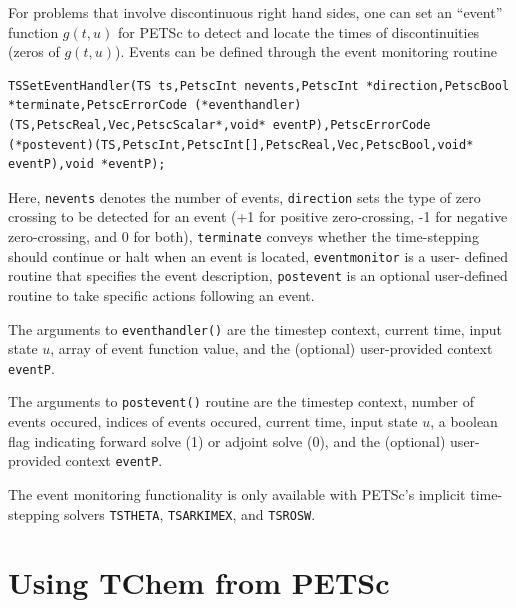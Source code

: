 For problems that involve discontinuous right hand sides, one can set an ``event'' function
$ g(t,u) $ for PETSc to detect and locate the times of discontinuities (zeros of $g(t,u)$). Events can be defined through the
event monitoring routine
\begin{lstlisting}
TSSetEventHandler(TS ts,PetscInt nevents,PetscInt *direction,PetscBool *terminate,PetscErrorCode (*eventhandler)(TS,PetscReal,Vec,PetscScalar*,void* eventP),PetscErrorCode (*postevent)(TS,PetscInt,PetscInt[],PetscReal,Vec,PetscBool,void* eventP),void *eventP);
\end{lstlisting}
Here, \lstinline{nevents} denotes the number of events, \lstinline{direction} sets the type of zero crossing to be detected for
an event (+1 for positive zero-crossing, -1 for negative zero-crossing, and 0 for both), \lstinline{terminate} conveys whether
the time-stepping should continue or halt when an event is located, \lstinline{eventmonitor} is a user-
defined routine that specifies the event description, \lstinline{postevent} is an optional user-defined routine to take
specific actions following an event.

The arguments to \lstinline{eventhandler()} are the timestep context, current time, input state $u$, array of event function
value, and the (optional) user-provided context \lstinline{eventP}.

The arguments to \lstinline{postevent()} routine are
the timestep context, number of events occured, indices of events occured, current time, input state $u$, a boolean flag indicating forward solve (1) or adjoint solve (0), and the (optional)
user-provided context \lstinline{eventP}.

The event monitoring functionality is only available with PETSc's implicit time-stepping solvers \lstinline{TSTHETA}, \lstinline{TSARKIMEX}, and \lstinline{TSROSW}.


\section{Using TChem from PETSc}
\label{sec_tchem}

